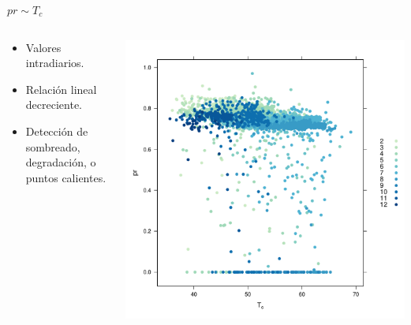 \documentclass[aspectratio=169, usenames,svgnames,dvipsnames]{beamer}
\begin{document}
\begin{frame}[label={sec:orgbde23dd}]{\(pr \sim T_c\)}
\begin{columns}
\begin{column}{0.3\columnwidth}
\begin{itemize}
\item Valores intradiarios.
\item Relación lineal decreciente.
\item Detección de sombreado, degradación, o puntos calientes.
\end{itemize}
\end{column}

\begin{column}{0.7\columnwidth}
\begin{center}
\includegraphics[height=0.95\textheight]{../figs/prTc.pdf}
\end{center}
\end{column}
\end{columns}
\end{frame}
\end{document}
